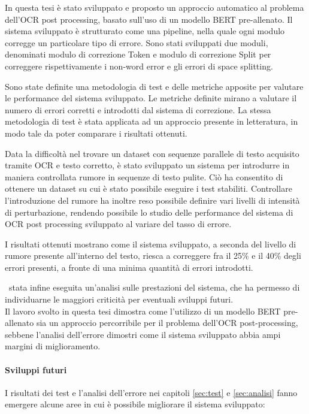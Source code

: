In questa tesi è stato sviluppato e proposto un approccio automatico al problema dell'OCR post processing, basato sull'uso di un modello BERT pre-allenato. Il sistema sviluppato è strutturato come una pipeline, nella quale ogni modulo corregge un particolare tipo di errore. Sono stati sviluppati due moduli, denominati modulo di correzione Token e modulo di correzione Split per correggere rispettivamente i non-word error e gli errori di space splitting.

Sono state definite una metodologia di test e delle metriche apposite per valutare le performance del sistema sviluppato. Le metriche definite mirano a valutare il numero di errori corretti e introdotti dal sistema di correzione. La stessa metodologia di test è stata applicata ad un approccio presente in letteratura, in modo tale da poter comparare i risultati ottenuti.

 Data la difficoltà nel trovare un dataset con sequenze parallele di testo acquisito tramite OCR e testo corretto, è stato sviluppato un sistema per introdurre in maniera controllata rumore in sequenze di testo pulite. Ciò ha consentito di ottenere un dataset su cui è stato possibile eseguire i test stabiliti. Controllare l'introduzione del rumore ha inoltre reso possibile definire vari livelli di intensità di perturbazione, rendendo possibile lo studio delle performance del sistema di OCR post processing sviluppato al variare del tasso di errore. 
 
I risultati ottenuti mostrano come il sistema sviluppato, a seconda del livello di rumore presente all'interno del testo, riesca a correggere fra il 25\% e il 40\% degli errori presenti, a fronte di una minima quantità di errori introdotti. 

\E\ stata infine eseguita un'analisi sulle prestazioni del sistema, che ha permesso di individuarne le maggiori criticità per eventuali sviluppi futuri.\\
Il lavoro svolto in questa tesi dimostra come l'utilizzo di un modello BERT pre-allenato sia un approccio percorribile per il problema dell'OCR post-processing, sebbene l'analisi dell'errore dimostri come il sistema sviluppato abbia ampi margini di miglioramento.

\paragraph{Sviluppi futuri} I risultati dei test e l'analisi dell'errore nei capitoli \ref{sec:test} e \ref{sec:analisi} fanno emergere alcune aree in cui è possibile migliorare il sistema sviluppato:

